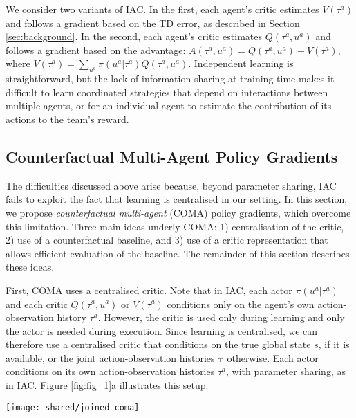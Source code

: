 \documentclass[letterpaper]{article}
\newcommand{\myvecsym}[1]{\boldsymbol{#1}}
\newcommand{\vtau}{\myvecsym{\tau}}
\begin{document}
We consider two variants of IAC. In the first, each agent's critic estimates $V(\tau^a)$ and follows a gradient based on the TD error, as described in Section \ref{sec:background}.  In the second, each agent's critic estimates $Q(\tau^a,u^a)$ and follows a gradient based on the advantage: $A(\tau^a, u^a) = Q(\tau^a,u^a)  - V(\tau^a)$, where $V(\tau^a) = \sum_{u^a}  \pi(u^a | \tau^a) Q(\tau^a,u^a)$. Independent learning is straightforward, but the lack of information sharing at training time makes it difficult to learn coordinated strategies that depend on interactions between multiple agents, or for an individual agent to estimate the contribution of its actions to the team's reward. 

\subsection{Counterfactual Multi-Agent Policy Gradients}
The difficulties discussed above arise because, beyond parameter sharing, IAC fails to exploit the fact that learning is centralised in our setting.  In this section, we propose \emph{counterfactual multi-agent} (COMA) policy gradients, which overcome this limitation.  Three main ideas underly COMA: 1) centralisation of the critic, 2) use of a counterfactual baseline, and 3) use of a critic representation that allows efficient evaluation of the baseline.  The remainder of this section describes these ideas.

First, COMA uses a centralised critic.  Note that in IAC, each actor $\pi(u^a | \tau^a)$  and each critic $ Q(\tau^a,u^a) $ or $ V(\tau^a)$ conditions only on the agent's own action-observation history $\tau^a$.  However, the critic is used only during learning and only the actor is needed during execution.  Since learning is centralised, we can therefore use a centralised critic that conditions on the true global state $s$, if it is available, or the joint action-observation histories $\vtau$ otherwise. Each actor conditions on its own action-observation histories $\tau^a$, with parameter sharing, as in IAC.  Figure \ref{fig:fig_1}a illustrates this setup.

\begin{figure*}[ht]
\centering
	\texttt{[image: shared/joined\_coma]}
\caption{In (a), information flow between the decentralised actors, the environment and the centralised critic in COMA; red arrows and components are only required during centralised learning. In (b) and (c), architectures of the actor and critic. 
}
\label{fig:fig_1}
\end{figure*}
\end{document}
